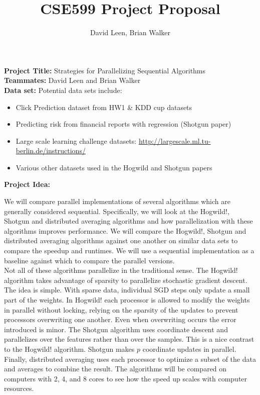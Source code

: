 \documentclass{article}
\title{CSE599 Project Proposal}
\author{David Leen, Brian Walker}
\begin{document}
\maketitle

\textbf{Project Title:}  Strategies for Parallelizing Sequential Algorithms \\
\textbf{Teammates:}  David Leen and Brian Walker \\
\textbf{Data set:} Potential data sets include: 
	\begin{itemize}
		\item Click Prediction dataset from HW1 \& KDD cup datasets
		\item Predicting risk from financial reports with regression (Shotgun paper)
		\item Large scale learning challenge datasets: \url{http://largescale.ml.tu-berlin.de/instructions/}
		\item Various other datasets used in the Hogwild and Shotgun papers 
	\end{itemize}
	
\textbf{Project Idea:}

	We will compare parallel implementations of several algorithms which are generally considered sequential. Specifically, we will look at the Hogwild!, Shotgun and distributed averaging algorithms and how parallelization with these algorithms improves performance. We will compare the Hogwild!, Shotgun and distributed averaging algorithms against one another on similar data sets to compare the speedup and runtimes.  We will use a sequential implementation as a baseline against which to compare the parallel versions.  \\
	
	Not all of these algorithms parallelize in the traditional sense. The Hogwild! algorithm takes advantage of sparsity to parallelize stochastic gradient descent. The idea is simple. With sparse data, individual SGD steps only update a small part of the weights. In Hogwild! each processor is allowed to modify the weights in parallel without locking, relying on the sparsity of the updates to prevent processors overwriting one another. Even when overwriting occurs the error introduced is minor.
	The Shotgun algorithm uses coordinate descent and parallelizes over the features rather than over the samples. This is a nice contrast to the Hogwild! algorithm. Shotgun makes $p$ coordinate updates in parallel.
	Finally, distributed averaging uses each processor to optimize a subset of the data and averages to combine the result. 
	The algorithms will be compared on computers with 2, 4, and 8 cores to see how the speed up scales with computer resources.
		
\end{document}
